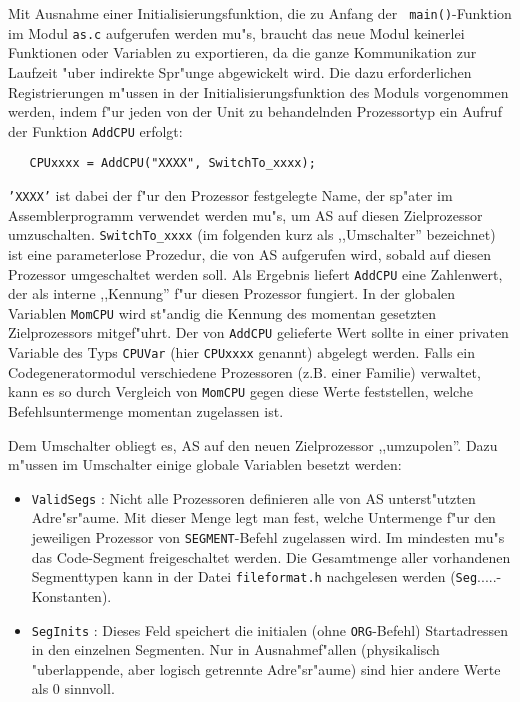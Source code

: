 \documentclass[12pt,a4paper,twoside]{report}
\newcommand{\tty}[1]{{\tt #1}}
\begin{document}
{Mit Ausnahme einer Initialisierungsfunktion, die zu Anfang der {\tt
main()}-Funktion im Modul {\tt as.c} aufgerufen werden mu"s, braucht das
neue Modul keinerlei Funktionen oder Variablen zu exportieren, da die
ganze Kommunikation zur Laufzeit "uber indirekte Spr"unge abgewickelt
wird.  Die dazu erforderlichen Registrierungen m"ussen in der
Initialisierungsfunktion des Moduls vorgenommen werden, indem f"ur jeden
von der Unit zu behandelnden Prozessortyp
ein Aufruf der Funktion \tty{AddCPU} erfolgt:
\begin{verbatim}
   CPUxxxx = AddCPU("XXXX", SwitchTo_xxxx);
\end{verbatim}
\tty{'XXXX'} ist dabei der f"ur den Prozessor festgelegte Name, der sp"ater
im Assemblerprogramm verwendet werden mu"s, um AS auf diesen Zielprozessor
umzuschalten.  \tty{SwitchTo\_xxxx} (im folgenden kurz als ,,Umschalter''
bezeichnet) ist eine parameterlose Prozedur, die von AS aufgerufen wird,
sobald auf diesen Prozessor umgeschaltet werden soll.  Als Ergebnis liefert
\tty{AddCPU} eine Zahlenwert, der als interne ,,Kennung'' f"ur diesen Prozessor
fungiert.  In der globalen Variablen \tty{MomCPU} wird st"andig die Kennung
des momentan gesetzten Zielprozessors mitgef"uhrt.  Der von \tty{AddCPU}
gelieferte Wert sollte in einer privaten Variable des Typs \tty{CPUVar} (hier
\tty{CPUxxxx} genannt) abgelegt werden.  Falls ein Codegeneratormodul
verschiedene Prozessoren (z.B. einer Familie) verwaltet, kann es so
durch Vergleich von \tty{MomCPU} gegen diese Werte feststellen, welche
Befehlsuntermenge momentan zugelassen ist.
\par
Dem Umschalter obliegt es, AS auf den neuen Zielprozessor ,,umzupolen''.
Dazu m"ussen im Umschalter einige globale Variablen besetzt werden:
\begin{itemize}
\item{\tty{ValidSegs} : Nicht alle Prozessoren definieren alle von AS
      unterst"utzten Adre"sr"aume.  Mit dieser Menge legt man fest,
      welche Untermenge f"ur den jeweiligen Prozessor von \tty{SEGMENT}-Befehl
      zugelassen wird.  Im mindesten mu"s das Code-Segment freigeschaltet
      werden.  Die Gesamtmenge aller vorhandenen Segmenttypen kann in der
      Datei \tty{fileformat.h} nachgelesen werden (\tty{Seg}.....-Konstanten).}
\item{\tty{SegInits} : Dieses Feld speichert die initialen (ohne \tty{ORG}-Befehl)
      Startadressen in den einzelnen Segmenten.  Nur in Ausnahmef"allen
      (physikalisch "uberlappende, aber logisch getrennte Adre"sr"aume)
      sind hier andere Werte als 0 sinnvoll.}

\end{itemize}}
\end{document}

